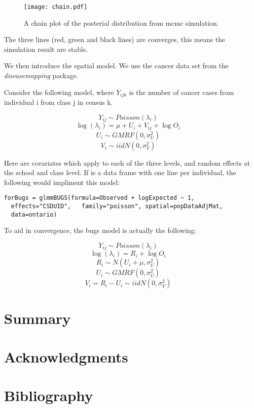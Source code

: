 \documentclass{article}
\begin{document}
\begin{figure}[ht]
\begin{center}
\texttt{[image: chain.pdf]}
\caption{A chain plot of the posterial distribution from mcmc simulation.}\label{singleellipse}
\end{center}
\end{figure}

The three lines (red, green and black lines) are converges, this means the simulation result are stable. 


We then introduce the spatial model. We use the cancer data set from the \textit{diseasemapping} package. 

Consider the following model, where $Y_{ijk}$ is the number of cancer cases from individual i from class j in census k.  

\[Y_{ij} \sim  Poisson(\lambda_i)\]
\[\log(\lambda_i) = \mu + U_i + V_{ij}+ \log{O_i}\]
\[U_i \sim GMRF(0, \sigma_U^2)\]
\[V_{i} \sim iid N(0, \sigma_V^2)\] 

Here are covariates which apply to each of the three levels, and random effects at the school and class level. 
If  is a data frame with one line per individual, the following would impliment this model: 
\begin{verbatim}
forBugs = glmmBUGS(formula=Observed + logExpected ~ 1,
  effects="CSDUID",   family="poisson", spatial=popDataAdjMat,
  data=ontario)
\end{verbatim}
To aid in convergence, the bugs model is actually the following:

\[Y_{ij} \sim  Poisson(\lambda_i)\]
\[\log(\lambda_i) = R_i+ \log{O_i}\]
\[R_i \sim N(U_i + \mu, \sigma_U^2)\]
\[U_i \sim GMRF(0, \sigma_U^2)\]
\[V_{i} = R_i - U_i \sim iid N(0, \sigma_V^2)\] 


\section{Summary}

\section{Acknowledgments}


\section{Bibliography}
\end{document}
